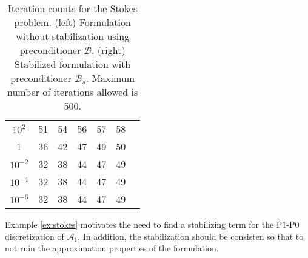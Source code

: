 \begin{example}
\begin{table}
{\begin{minipage}{0.49\textwidth}
\begin{center}
\begin{tabular}{c|cccccc}
$10^{2}$ & 51 & 54 & 56 & 57 & 58\\
1 & 36 & 42 & 47 & 49 & 50\\
$10^{-2}$ & 32 & 38 & 44 & 47 & 49\\
$10^{-4}$ & 32 & 38 & 44 & 47 & 49\\
$10^{-6}$ & 32 & 38 & 44 & 47 & 49\\
\hline
  \end{tabular}
  \end{center}
  \end{minipage}
  }
    \caption{Iteration counts for the Stokes problem. (left) Formulation without
      stabilization using preconditioner $\mathcal{B}$. (right) Stabilized
      formulation with preconditioner $\mathcal{B}_s$. Maximum number of
    iterations allowed is 500.}
  \label{tab:stokes}
  \end{table}
\end{example}

Example \ref{ex:stokes} motivates the need to find a stabilizing term
for the P1-P0 discretization of $\mathcal{A}_1$. In addition, the stabilization
should be consisten so that to not ruin the approximation properties of the
formulation.
